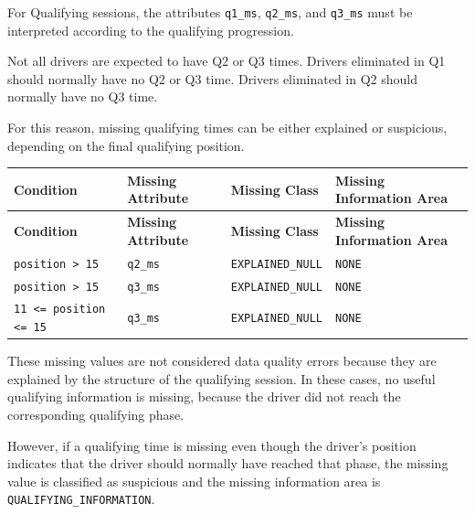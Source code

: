 \documentclass[a4paper,11pt]{article}
\begin{document}
	For Qualifying sessions, the attributes \texttt{q1\_ms}, \texttt{q2\_ms}, and \texttt{q3\_ms} must be interpreted according to the qualifying progression.
	
	Not all drivers are expected to have Q2 or Q3 times.
	Drivers eliminated in Q1 should normally have no Q2 or Q3 time.
	Drivers eliminated in Q2 should normally have no Q3 time.
	
	For this reason, missing qualifying times can be either explained or suspicious,
	depending on the final qualifying position.
	
	\begin{longtable}{p{4.5cm}p{2.2cm}p{3.5cm}p{4cm}}
		\toprule
		\textbf{Condition} & \textbf{Missing Attribute} & \textbf{Missing Class} & \textbf{Missing Information Area} \\
		\midrule
		\endfirsthead
		
		\toprule
		\textbf{Condition} & \textbf{Missing Attribute} & \textbf{Missing Class} & \textbf{Missing Information Area} \\
		\midrule
		\endhead
		
		\texttt{position > 15}
		& \texttt{q2\_ms}
		& \texttt{EXPLAINED\_NULL}
		& \texttt{NONE} \\
		\midrule
		
		\texttt{position > 15}
		& \texttt{q3\_ms}
		& \texttt{EXPLAINED\_NULL}
		& \texttt{NONE} \\
		\midrule
		
		\texttt{11 <= position <= 15}
		& \texttt{q3\_ms}
		& \texttt{EXPLAINED\_NULL}
		& \texttt{NONE} \\
		\bottomrule
	\end{longtable}
	
	These missing values are not considered data quality errors because they are explained by the structure of the qualifying session. In these cases, no useful qualifying information is missing, because the driver did not reach the corresponding qualifying phase.
	
	However, if a qualifying time is missing even though the driver's position indicates that the driver should normally have reached that phase, the missing value is classified
	as suspicious and the missing information area is \texttt{QUALIFYING\_INFORMATION}.
	
\end{document}
